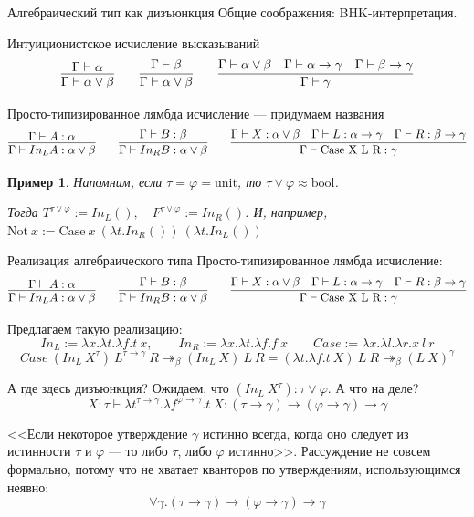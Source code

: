 \documentclass[aspectratio=169]{beamer}
\newtheorem{exm}{Пример}[section]
\begin{document}
\begin{frame}{Алгебраический тип как дизъюнкция}
Общие соображения: BHK-интерпретация. 

Интуиционистское исчисление высказываний
$$\infer{\Gamma\vdash\alpha\vee\beta}{\Gamma\vdash\alpha}\quad\quad\infer{\Gamma\vdash\alpha\vee\beta}{\Gamma\vdash\beta}\quad\quad\infer{\Gamma\vdash\gamma}{\Gamma\vdash\alpha\vee\beta\quad\Gamma\vdash\alpha\rightarrow\gamma\quad\Gamma\vdash\beta\rightarrow\gamma}$$

Просто-типизированное лямбда исчисление --- придумаем названия
$$\infer{\Gamma\vdash In_L A:\alpha\vee\beta}{\Gamma\vdash A:\alpha}\quad\quad\infer{\Gamma\vdash In_R B:\alpha\vee\beta}{\Gamma\vdash B:\beta}\quad\quad\infer{\Gamma\vdash \text{Case X L R}:\gamma}{\Gamma\vdash X:\alpha\vee\beta\quad\Gamma\vdash L:\alpha\rightarrow\gamma\quad\Gamma\vdash R:\beta\rightarrow\gamma}$$

\begin{exm}
Напомним, если $\tau = \varphi = \text{unit}$, то $\tau \vee \varphi \approx \text{bool}$.

Тогда $T^{\tau\vee\varphi} := In_L (),\quad F^{\tau\vee\varphi} := In_R ()$.
И, например, $\text{Not}\ x := \text{Case}\ x\ (\lambda t.In_R ())\ (\lambda t.In_L ())$
\end{exm}
\end{frame}

\begin{frame}{Реализация алгебраического типа}
Просто-типизированное лямбда исчисление:
$$\infer{\Gamma\vdash In_L A:\alpha\vee\beta}{\Gamma\vdash A:\alpha}\quad\quad\infer{\Gamma\vdash In_R B:\alpha\vee\beta}{\Gamma\vdash B:\beta}\quad\quad\infer{\Gamma\vdash \text{Case X L R}:\gamma}{\Gamma\vdash X:\alpha\vee\beta\quad\Gamma\vdash L:\alpha\rightarrow\gamma\quad\Gamma\vdash R:\beta\rightarrow\gamma}$$

Предлагаем такую реализацию:
$$In_L := \lambda x.\lambda t.\lambda f.t\ x, \quad\quad In_R := \lambda x.\lambda t.\lambda f.f\ x\quad\quad Case := \lambda x.\lambda l.\lambda r.x\ l\ r$$
\vspace{-0.7cm}
$$Case\ (In_L\ X^{\tau})\ L^{\tau\rightarrow\gamma}\ R \twoheadrightarrow_\beta (In_L\ X)\ L\ R = (\lambda t.\lambda f.t\ X)\ L\ R\twoheadrightarrow_\beta (L\ X)^{\gamma}$$

А где здесь дизъюнкция? Ожидаем, что $(In_L\ X^{\tau}): \tau\vee\varphi$. А что на деле?
$$X : \tau \vdash \lambda t^{\tau\rightarrow\gamma}.\lambda f^{\varphi\rightarrow\gamma}.t\ X : (\tau\rightarrow\gamma)\rightarrow(\varphi\rightarrow\gamma)\rightarrow\gamma$$

<<Если некоторое утверждение $\gamma$ истинно {\color{red}всегда}, когда оно следует из истинности $\tau$ и $\varphi$ --- то либо $\tau$, либо $\varphi$ истинно>>.
Рассуждение не совсем формально, потому что не хватает {\color{red}кванторов по утверждениям}, использующимся неявно:
$$\forall \gamma.(\tau\rightarrow\gamma)\rightarrow(\varphi\rightarrow\gamma)\rightarrow\gamma$$
\end{frame}
\end{document}
